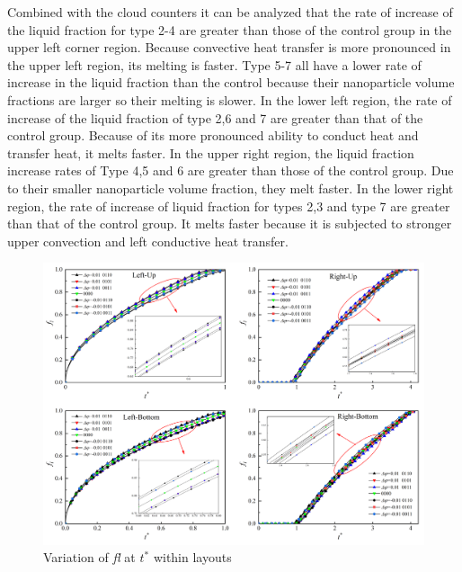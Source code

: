 \documentclass[preprint,12pt]{elsarticle}
\begin{document}
Combined with the cloud counters it can be analyzed that the rate of increase of the liquid fraction for type 2-4 are greater than those of the control group in the upper left corner region. Because convective heat transfer is more pronounced in the upper left region, its melting is faster. 
Type 5-7 all have a lower rate of increase in the liquid fraction than the control because their nanoparticle volume fractions are larger so their melting is slower.
In the lower left region, the rate of increase of the liquid fraction of type 2,6 and 7 are greater than that of the control group. Because of its more pronounced ability to conduct heat and transfer heat, it melts faster.
In the upper right region, the liquid fraction increase rates of Type 4,5 and 6 are greater than those of the control group. Due to their smaller nanoparticle volume fraction, they melt faster.
In the lower right region, the rate of increase of liquid fraction for types 2,3 and type 7 are greater than that of the control group. It melts faster because it is subjected to stronger upper convection and left conductive heat transfer.
\begin{figure}[H]
	\centering
	\includegraphics[scale=0.6]{Fig/fl.png}
	\caption{Variation of \textit{fl} at $ t^* $ within layouts}
	\label{Fig_fl2} 
\end{figure}
\end{document}
